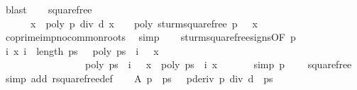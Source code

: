 \begin{isabellebody}
\ blast\isanewline
\ \ \isamarkupfalse%
\ squarefree{\isacharprime}{\isacharcolon}\isanewline
\ \ \ \ \ \ {\isachardoublequoteopen}{\isasymAnd}x{\isachardot}\ {\isasymnot}\ {\isacharparenleft}poly\ {\isacharparenleft}p\ div\ d{\isacharparenright}\ x\ {\isacharequal}\ {}\ {\isasymand}\ poly\ {\isacharparenleft}sturm{\isacharunderscore}squarefree{\isacharprime}\ p\ {\isacharbang}\ {}{\isacharparenright}\ x\ {\isacharequal}\ {}{\isacharparenright}{\isachardoublequoteclose}\isanewline
\ \ \ \ \ \ \isamarkupfalse%
\ coprime{\isacharunderscore}imp{\isacharunderscore}no{\isacharunderscore}common{\isacharunderscore}roots\ \isamarkupfalse%
\ simp\isanewline
\isanewline
\ \ \isamarkupfalse%
\ sturm{\isacharunderscore}squarefree{\isacharprime}{\isacharunderscore}signs{\isacharbrackleft}OF\ {\isacharbackquoteopen}p\ {\isasymnoteq}\ {}{\isacharbackquoteclose}{\isacharbrackright}\isanewline
\ \ \ \ \ \ \isamarkupfalse%
\ {\isachardoublequoteopen}{\isasymAnd}i\ x{\isachardot}\ {\isasymlbrakk}i\ {\isacharless}\ length\ {\isacharquery}ps{\isacharprime}\ {\isacharminus}\ {}{\isacharsemicolon}\ poly\ {\isacharparenleft}{\isacharquery}ps{\isacharprime}\ {\isacharbang}\ {\isacharparenleft}i\ {\isacharplus}\ {}{\isacharparenright}{\isacharparenright}\ x\ {\isacharequal}\ {}{\isasymrbrakk}\isanewline
\ \ \ \ \ \ \ \ \ \ \ \ \ \ \ \ {\isasymLongrightarrow}\ poly\ {\isacharparenleft}{\isacharquery}ps{\isacharprime}\ {\isacharbang}\ {\isacharparenleft}i\ {\isacharplus}\ {}{\isacharparenright}{\isacharparenright}\ x\ {\isacharasterisk}\ poly\ {\isacharparenleft}{\isacharquery}ps{\isacharprime}\ {\isacharbang}\ i{\isacharparenright}\ x\ {\isacharless}\ {}{\isachardoublequoteclose}\ \isacommand{{\isachardot}}\isamarkupfalse%
\isanewline
\isanewline
\ \ \isamarkupfalse%
\ {\isacharbrackleft}simp{\isacharbrackright}{\isacharcolon}\ {\isachardoublequoteopen}{\isacharquery}p{\isacharprime}\ {\isasymnoteq}\ {}{\isachardoublequoteclose}\ \isamarkupfalse%
\ squarefree\ \isamarkupfalse%
\ {\isacharparenleft}simp\ add{\isacharcolon}\ rsquarefree{\isacharunderscore}def{\isacharparenright}\isanewline
\ \ \isamarkupfalse%
\ A{\isacharcolon}\ {\isachardoublequoteopen}{\isacharquery}p{\isacharprime}\ {\isacharequal}\ {\isacharquery}ps{\isacharprime}\ {\isacharbang}\ {}{\isachardoublequoteclose}\ {\isachardoublequoteopen}pderiv\ p\ div\ d\ {\isacharequal}\ {\isacharquery}ps{\isacharprime}\ {\isacharbang}\ {}{\isachardoublequoteclose}\isanewline

\end{isabellebody}
